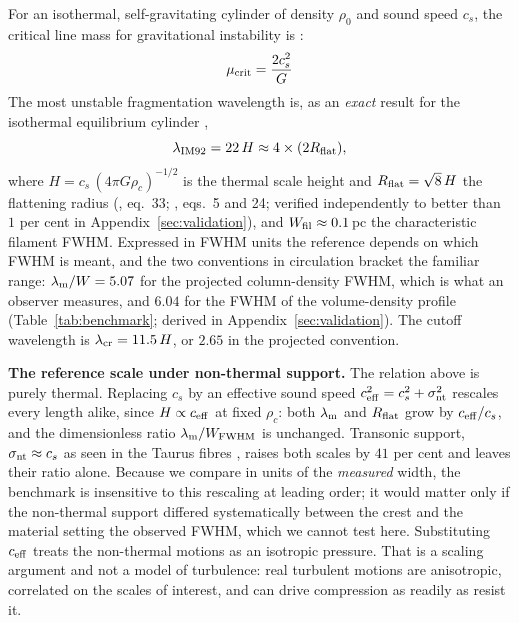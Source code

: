 \documentclass[usenatbib,twoside,twocolumn]{mnras}
\begin{document}
For an isothermal, self-gravitating cylinder of density $\rho_0$ and sound speed $c_s$, the critical line mass for gravitational instability is \citep{Ostriker1964}:
\begin{equation}
\mu_{\rm crit} = \frac{2c_s^2}{G}
\label{eq:mucrit}
\end{equation}
The most unstable fragmentation wavelength is, as an \emph{exact} result for the isothermal equilibrium cylinder \citep{Inutsuka1992},
\begin{equation}
\lambda_{\rm IM92} = 22\,H \approx 4\times(2R_{\rm flat}),
\label{eq:lambdam}
\end{equation}
where $H = c_s\,(4\pi G\rho_c)^{-1/2}$ is the thermal scale height and $R_{\rm flat}=\sqrt8\,H$ the flattening radius (\citealt{Nagasawa1987}, eq.~33; \citealt{Fischera2012}, eqs.~5 and 24; verified independently to better than $1$ per cent in Appendix~\ref{sec:validation}), and $W_{\rm fil}\approx0.1$\,pc the characteristic filament FWHM. Expressed in FWHM units the reference depends on which FWHM is meant, and the two conventions in circulation bracket the familiar range: $\lambda_{\rm m}/W=5.07$ for the projected column-density FWHM, which is what an observer measures, and $6.04$ for the FWHM of the volume-density profile (Table~\ref{tab:benchmark}; derived in Appendix~\ref{sec:validation}). The cutoff wavelength is $\lambda_{\rm cr}=11.5\,H$, or $2.65$ in the projected convention. 

\smallskip\noindent\textbf{The reference scale under non-thermal support.} The relation above is purely thermal. Replacing $c_s$ by an effective sound speed $c_{\rm eff}^2=c_s^2+\sigma_{\rm nt}^2$ rescales every length alike, since $H\propto c_{\rm eff}$ at fixed $\rho_c$: both $\lambda_{\rm m}$ and $R_{\rm flat}$ grow by $c_{\rm eff}/c_s$, and the dimensionless ratio $\lambda_{\rm m}/W_{\rm FWHM}$ is unchanged. Transonic support, $\sigma_{\rm nt}\approx c_s$ as seen in the Taurus fibres \citep{Hacar2013}, raises both scales by $41$ per cent and leaves their ratio alone. Because we compare in units of the \emph{measured} width, the benchmark is insensitive to this rescaling at leading order; it would matter only if the non-thermal support differed systematically between the crest and the material setting the observed FWHM, which we cannot test here. Substituting $c_{\rm eff}$ treats the non-thermal motions as an isotropic pressure. That is a scaling argument and not a model of turbulence: real turbulent motions are anisotropic, correlated on the scales of interest, and can drive compression as readily as resist it.
\end{document}
